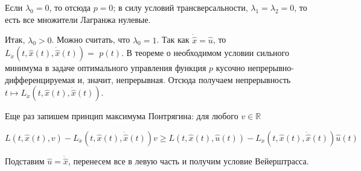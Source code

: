 \begin{task}
    Если $\lambda_{0}=0$, то отсюда $p=0$; в силу условий трансверсальности, $\lambda_{1}=\lambda_{2}=0$, то есть все множители Лагранжа нулевые.
    
    Итак, $\lambda_{0}>0$. Можно считать, что $\lambda_{0}=1$. Так как $\dot{\hat{x}}=\hat{u}$, то $L_{\dot{x}}(t, \hat{x}(t), \dot{\hat{x}}(t))=$ $p(t)$. В теореме о необходимом условии сильного минимума в задаче оптимального управления функция $p$ кусочно непрерывно-дифференцируемая и, значит, непрерывная. Отсюда получаем непрерывность $t \mapsto L_{\dot{x}}(t, \hat{x}(t), \dot{\hat{x}}(t))$.
    
    Еще раз запишем принцип максимума Понтрягина: для любого $v \in \mathbb{R}$
    
    $$
    L(t, \hat{x}(t), v)-L_{\dot{x}}(t, \hat{x}(t), \dot{\hat{x}}(t)) v \geq L(t, \hat{x}(t), \hat{u}(t))-L_{\dot{x}}(t, \hat{x}(t), \dot{\hat{x}}(t)) \hat{u}(t)
    $$
    
    Подставим $\hat{u}=\dot{\hat{x}}$, перенесем все в левую часть и получим условие Вейерштрасса.
    
    \end{task}